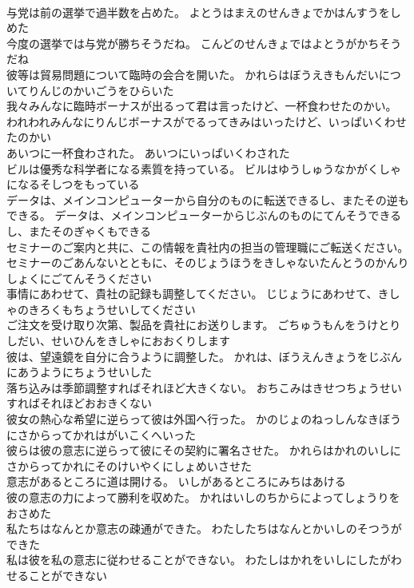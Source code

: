 \documentclass[8pt]{extreport}
\begin{document}
\begin{CJK}{UTF8}{min}
\\	与党は前の選挙で過半数を占めた。	よとうはまえのせんきょでかはんすうをしめた 
\\	今度の選挙では与党が勝ちそうだね。	こんどのせんきょではよとうがかちそうだね 
\\	彼等は貿易問題について臨時の会合を開いた。	かれらはぼうえきもんだいについてりんじのかいごうをひらいた 
\\	我々みんなに臨時ボーナスが出るって君は言ったけど、一杯食わせたのかい。	われわれみんなにりんじボーナスがでるってきみはいったけど、いっぱいくわせたのかい 
\\	あいつに一杯食わされた。	あいつにいっぱいくわされた 
\\	ビルは優秀な科学者になる素質を持っている。	ビルはゆうしゅうなかがくしゃになるそしつをもっている 
\\	データは、メインコンピューターから自分のものに転送できるし、またその逆もできる。	データは、メインコンピューターからじぶんのものにてんそうできるし、またそのぎゃくもできる 
\\	セミナーのご案内と共に、この情報を貴社内の担当の管理職にご転送ください。	セミナーのごあんないとともに、そのじょうほうをきしゃないたんとうのかんりしょくにごてんそうください 
\\	事情にあわせて、貴社の記録も調整してください。	じじょうにあわせて、きしゃのきろくもちょうせいしてください 
\\	ご注文を受け取り次第、製品を貴社にお送りします。	ごちゅうもんをうけとりしだい、せいひんをきしゃにおおくりします 
\\	彼は、望遠鏡を自分に合うように調整した。	かれは、ぼうえんきょうをじぶんにあうようにちょうせいした 
\\	落ち込みは季節調整すればそれほど大きくない。	おちこみはきせつちょうせいすればそれほどおおきくない 
\\	彼女の熱心な希望に逆らって彼は外国へ行った。	かのじょのねっしんなきぼうにさからってかれはがいこくへいった 
\\	彼らは彼の意志に逆らって彼にその契約に署名させた。	かれらはかれのいしにさからってかれにそのけいやくにしょめいさせた 
\\	意志があるところに道は開ける。	いしがあるところにみちはあける 
\\	彼の意志の力によって勝利を収めた。	かれはいしのちからによってしょうりをおさめた 
\\	私たちはなんとか意志の疎通ができた。	わたしたちはなんとかいしのそつうができた 
\\	私は彼を私の意志に従わせることができない。	わたしはかれをいしにしたがわせることができない 

\end{CJK}
\end{document}
